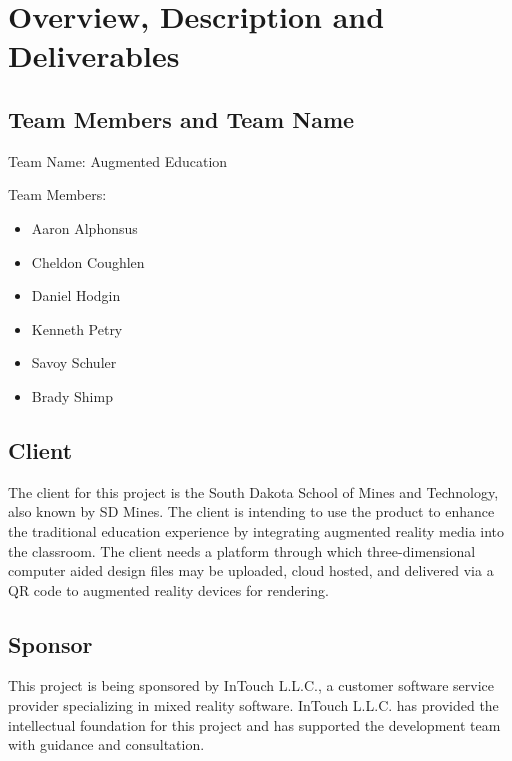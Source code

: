 

\chapter{Overview, Description and Deliverables}


\section{Team Members and Team Name}

Team Name: Augmented Education

\noindent Team Members:
\begin{itemize}
	\item Aaron Alphonsus
	\item Cheldon Coughlen
	\item Daniel Hodgin
	\item Kenneth Petry
	\item Savoy Schuler
	\item Brady Shimp
\end{itemize}

\section{Client}

The client for this project is the South Dakota School of Mines and Technology, also known by SD Mines. The client is intending to use the product to enhance the traditional education experience by integrating augmented reality media into the classroom. The client needs a platform through which three-dimensional computer aided design files may be uploaded, cloud hosted, and delivered via a QR code to augmented reality devices for rendering.

\section{Sponsor}

This project is being sponsored by InTouch L.L.C., a customer software service provider specializing in mixed reality software. InTouch L.L.C. has provided the intellectual foundation for this project and has supported the development team with guidance and consultation. 

